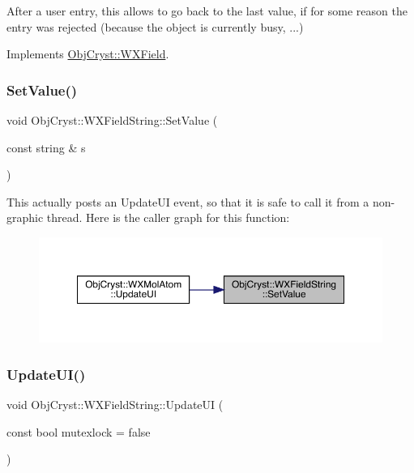 After a user entry, this allows to go back to the last value, if for some reason the entry was rejected (because the object is currently busy, ...) 

Implements \mbox{\hyperlink{class_obj_cryst_1_1_w_x_field_a178d6d770d1e3adfa02e27da94b2dffa}{Obj\+Cryst\+::\+W\+X\+Field}}.

\mbox{\label{class_obj_cryst_1_1_w_x_field_string_a26889c2974269016abf0ed81c860ca29}} 
\subsubsection{\texorpdfstring{SetValue()}{SetValue()}}
{\footnotesize\ttfamily void Obj\+Cryst\+::\+W\+X\+Field\+String\+::\+Set\+Value (\begin{DoxyParamCaption}\item[{const string \&}]{s }\end{DoxyParamCaption})}

This actually posts an Update\+UI event, so that it is safe to call it from a non-\/graphic thread. Here is the caller graph for this function\+:
\nopagebreak
\begin{figure}[H]
\begin{center}
\leavevmode
\includegraphics[width=350pt]{class_obj_cryst_1_1_w_x_field_string_a26889c2974269016abf0ed81c860ca29_icgraph}
\end{center}
\end{figure}
\mbox{\label{class_obj_cryst_1_1_w_x_field_string_ae5d38d52534a9ccbc0f9c030fc447332}} 
\subsubsection{\texorpdfstring{UpdateUI()}{UpdateUI()}}
{\footnotesize\ttfamily void Obj\+Cryst\+::\+W\+X\+Field\+String\+::\+Update\+UI (\begin{DoxyParamCaption}\item[{const bool}]{mutexlock = {\ttfamily false} }\end{DoxyParamCaption})\hspace{0.3cm}{\ttfamily [virtual]}}

